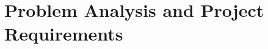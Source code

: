 \chapter{Problem Analysis and Project Requirements}\label{ch:problem-analysis-and-project-requirements}

	
	
	
	
